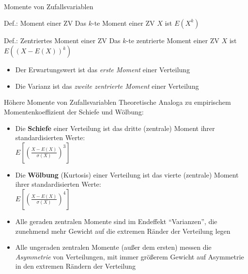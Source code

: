 \documentclass[
  10pt,
  ignorenonframetext,
]{beamer}
\providecommand{\tightlist}{%
  \setlength{\itemsep}{0pt}\setlength{\parskip}{0pt}}
\begin{document}
\begin{frame}{Momente von Zufallsvariablen}
\protect\hypertarget{momente-von-zufallsvariablen}{}
\begin{block}{Def.: Moment einer ZV}
\protect\hypertarget{def.-moment-einer-zv}{}
Das \(k\)-te Moment einer ZV \(X\) ist \(E(X^k)\)
\end{block}

\begin{block}{Def.: Zentriertes Moment einer ZV}
\protect\hypertarget{def.-zentriertes-moment-einer-zv}{}
Das \(k\)-te zentrierte Moment einer ZV \(X\) ist
\(E\left((X-E(X))^k\right)\)
\end{block}

\begin{itemize}
\tightlist
\item
  Der Erwartungswert ist das \emph{erste Moment} einer Verteilung
\item
  Die Varianz ist das \emph{zweite zentrierte Moment} einer Verteilung
\end{itemize}
\end{frame}

\begin{frame}{Höhere Momente von Zufallsvariablen}
\protect\hypertarget{huxf6here-momente-von-zufallsvariablen}{}
Theoretische Analoga zu empirischem Momentenkoeffizient der Schiefe und
Wölbung:

\begin{itemize}
\item
  Die \textbf{Schiefe} einer Verteilung ist das dritte (zentrale) Moment
  ihrer standardisierten Werte:\\
  \(E\left[\left(\frac{X - E(X)}{\sigma(X)}\right)^3\right]\)
\item
  Die \textbf{Wölbung} (Kurtosis) einer Verteilung ist das vierte
  (zentrale) Moment ihrer standardisierten Werte:\\
  \(E\left[\left(\frac{X - E(X)}{\sigma(X)}\right)^4\right]\)
\item
  Alle geraden zentralen Momente sind im Endeffekt ``Varianzen'', die
  zunehmend mehr Gewicht auf die extremen Ränder der Verteilung legen
\item
  Alle ungeraden zentralen Momente (außer dem ersten) messen die
  \emph{Asymmetrie} von Verteilungen, mit immer größerem Gewicht auf
  Asymmetrie in den extremen Rändern der Verteilung
\end{itemize}
\end{frame}
\end{document}

